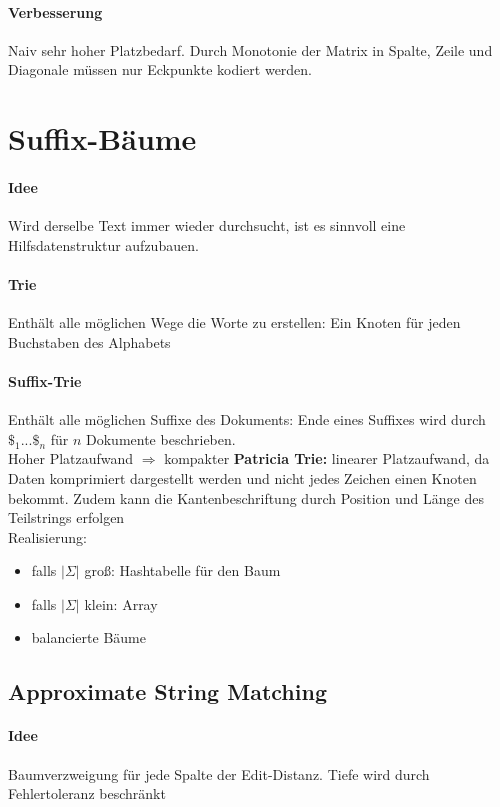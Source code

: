 \documentclass{article}
\begin{document}
\paragraph{Verbesserung} Naiv sehr hoher Platzbedarf. Durch Monotonie der Matrix in Spalte, Zeile und Diagonale müssen nur Eckpunkte kodiert werden.
\section{Suffix-Bäume}
\paragraph{Idee} Wird derselbe Text immer wieder durchsucht, ist es sinnvoll eine Hilfsdatenstruktur aufzubauen.
\paragraph{Trie} Enthält alle möglichen Wege die Worte zu erstellen: Ein Knoten für jeden Buchstaben des Alphabets
\paragraph{Suffix-Trie} Enthält alle möglichen Suffixe des Dokuments: Ende eines Suffixes wird durch $\$_{1} ... \$_{n}$ für $n$ Dokumente beschrieben. \\
Hoher Platzaufwand $\Rightarrow$ kompakter \textbf{Patricia Trie:}  linearer Platzaufwand, da Daten komprimiert dargestellt werden und nicht jedes Zeichen einen Knoten bekommt. Zudem kann die Kantenbeschriftung durch Position und Länge des Teilstrings erfolgen\\
Realisierung:
\begin{itemize}
\item falls $|\Sigma|$ groß: Hashtabelle für den Baum
\item falls $|\Sigma|$ klein: Array
\item balancierte Bäume
\end{itemize}

\subsection{Approximate String Matching}
\paragraph{Idee} Baumverzweigung für jede Spalte der Edit-Distanz. Tiefe wird durch Fehlertoleranz beschränkt
\end{document}
